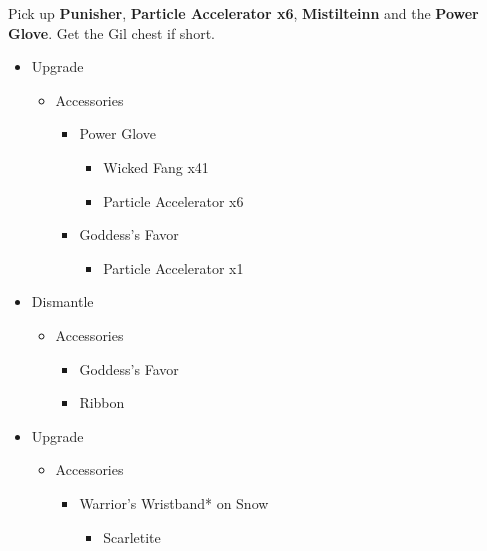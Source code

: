 Pick up \textbf{Punisher}, \textbf{Particle Accelerator x6}, \textbf{Mistilteinn} and the \textbf{Power Glove}.
Get the Gil chest if short.
\vfill
\ 
\columnbreak
\begin{upgrade}
	\begin{itemize}
		\item Upgrade
			\begin{itemize}
				\item Accessories
					\begin{itemize}
						\item Power Glove
							\begin{itemize}
								\item Wicked Fang x41
								\item Particle Accelerator x6
							\end{itemize}
						\item Goddess's Favor
							\begin{itemize}
								\item Particle Accelerator x1
							\end{itemize}
					\end{itemize}
			\end{itemize}
		\item Dismantle
			\begin{itemize}
				\item Accessories
					\begin{itemize}
						\item Goddess's Favor
						\item Ribbon
					\end{itemize}
			\end{itemize}		
		\item Upgrade
			\begin{itemize}
				\item Accessories
					\begin{itemize}
						\item Warrior's Wristband* on Snow
							\begin{itemize}
								\item Scarletite
							\end{itemize}
					\end{itemize}
			\end{itemize}		
	\end{itemize}
\end{upgrade}


